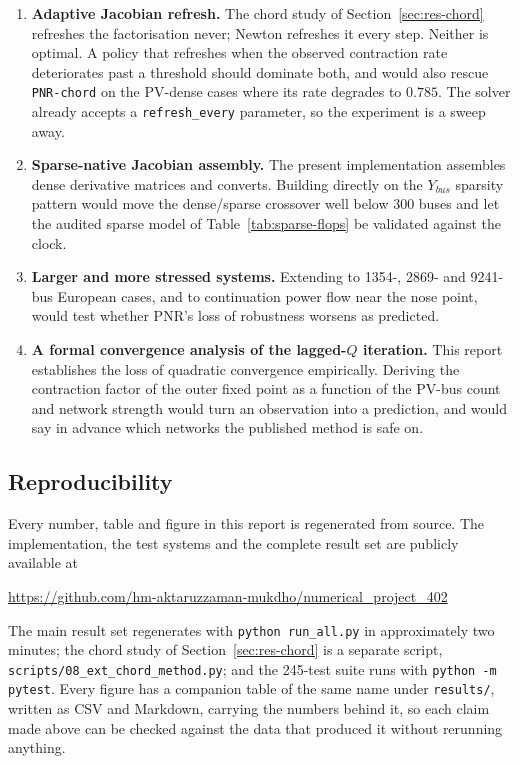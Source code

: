 \documentclass[sigconf,nonacm]{acmart}
\begin{document}
\begin{enumerate}
\item \textbf{Adaptive Jacobian refresh.} The chord study of
      Section~\ref{sec:res-chord} refreshes the factorisation never; Newton
      refreshes it every step. Neither is optimal. A policy that refreshes when
      the observed contraction rate deteriorates past a threshold should
      dominate both, and would also rescue \texttt{PNR-chord} on the PV-dense
      cases where its rate degrades to $0.785$. The solver already accepts a
      \texttt{refresh\_every} parameter, so the experiment is a sweep away.
\item \textbf{Sparse-native Jacobian assembly.} The present implementation
      assembles dense derivative matrices and converts. Building directly on the
      $Y_{bus}$ sparsity pattern would move the dense/sparse crossover well below
      300 buses and let the audited sparse model of
      Table~\ref{tab:sparse-flops} be validated against the clock.
\item \textbf{Larger and more stressed systems.} Extending to 1354-, 2869- and
      9241-bus European cases, and to continuation power flow near the nose
      point, would test whether PNR's loss of robustness worsens as predicted.
\item \textbf{A formal convergence analysis of the lagged-$Q$ iteration.}
      This report establishes the loss of quadratic convergence empirically.
      Deriving the contraction factor of the outer fixed point as a function of
      the PV-bus count and network strength would turn an observation into a
      prediction, and would say in advance which networks the published method
      is safe on.
\end{enumerate}

\subsection{Reproducibility}
Every number, table and figure in this report is regenerated from source. The
implementation, the test systems and the complete result set are publicly
available at

\begin{center}
\url{https://github.com/hm-aktaruzzaman-mukdho/numerical_project_402}
\end{center}

\noindent The main result set regenerates with \texttt{python run\_all.py} in
approximately two minutes; the chord study of Section~\ref{sec:res-chord} is a
separate script, \texttt{scripts/08\_ext\_chord\_method.py}; and the 245-test
suite runs with \texttt{python -m pytest}. Every figure has a companion table of
the same name under \texttt{results/}, written as CSV and Markdown, carrying the
numbers behind it, so each claim made above can be checked against the data that
produced it without rerunning anything.
\end{document}
